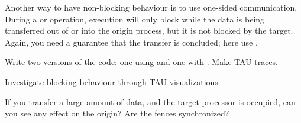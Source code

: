 Another way to have non-blocking behaviour is to use one-sided
communication.  During a  or  operation, execution will
only block while the data is being transferred out of or into the
origin process, but it is not blocked by the target. Again, you need a
guarantee that the transfer is concluded; here use
.

\begin{exercise}
  Write two versions of the code: one using  and one with .
  Make TAU traces.
\end{exercise}
Investigate blocking behaviour through TAU visualizations. 
\begin{exercise}
  If you transfer a large amount of data, and the target processor is
  occupied, can you see any effect on the origin? Are the fences
  synchronized?
\end{exercise}
